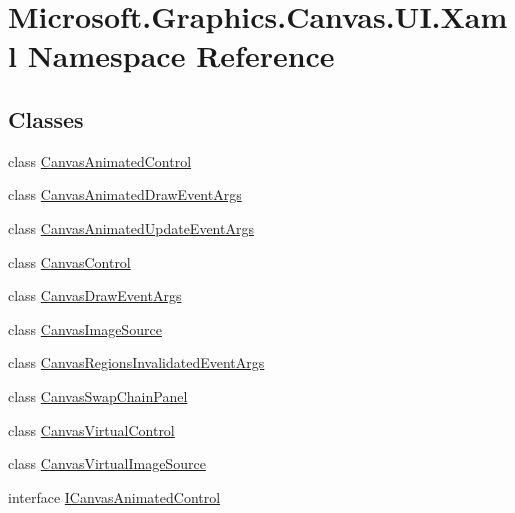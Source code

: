 \hypertarget{namespace_microsoft_1_1_graphics_1_1_canvas_1_1_u_i_1_1_xaml}{}\section{Microsoft.\+Graphics.\+Canvas.\+U\+I.\+Xaml Namespace Reference}
\label{namespace_microsoft_1_1_graphics_1_1_canvas_1_1_u_i_1_1_xaml}
\subsection*{Classes}
\begin{DoxyCompactItemize}
\item 
class \hyperlink{class_microsoft_1_1_graphics_1_1_canvas_1_1_u_i_1_1_xaml_1_1_canvas_animated_control}{Canvas\+Animated\+Control}
\item 
class \hyperlink{class_microsoft_1_1_graphics_1_1_canvas_1_1_u_i_1_1_xaml_1_1_canvas_animated_draw_event_args}{Canvas\+Animated\+Draw\+Event\+Args}
\item 
class \hyperlink{class_microsoft_1_1_graphics_1_1_canvas_1_1_u_i_1_1_xaml_1_1_canvas_animated_update_event_args}{Canvas\+Animated\+Update\+Event\+Args}
\item 
class \hyperlink{class_microsoft_1_1_graphics_1_1_canvas_1_1_u_i_1_1_xaml_1_1_canvas_control}{Canvas\+Control}
\item 
class \hyperlink{class_microsoft_1_1_graphics_1_1_canvas_1_1_u_i_1_1_xaml_1_1_canvas_draw_event_args}{Canvas\+Draw\+Event\+Args}
\item 
class \hyperlink{class_microsoft_1_1_graphics_1_1_canvas_1_1_u_i_1_1_xaml_1_1_canvas_image_source}{Canvas\+Image\+Source}
\item 
class \hyperlink{class_microsoft_1_1_graphics_1_1_canvas_1_1_u_i_1_1_xaml_1_1_canvas_regions_invalidated_event_args}{Canvas\+Regions\+Invalidated\+Event\+Args}
\item 
class \hyperlink{class_microsoft_1_1_graphics_1_1_canvas_1_1_u_i_1_1_xaml_1_1_canvas_swap_chain_panel}{Canvas\+Swap\+Chain\+Panel}
\item 
class \hyperlink{class_microsoft_1_1_graphics_1_1_canvas_1_1_u_i_1_1_xaml_1_1_canvas_virtual_control}{Canvas\+Virtual\+Control}
\item 
class \hyperlink{class_microsoft_1_1_graphics_1_1_canvas_1_1_u_i_1_1_xaml_1_1_canvas_virtual_image_source}{Canvas\+Virtual\+Image\+Source}
\item 
interface \hyperlink{interface_microsoft_1_1_graphics_1_1_canvas_1_1_u_i_1_1_xaml_1_1_i_canvas_animated_control}{I\+Canvas\+Animated\+Control}

\end{DoxyCompactItemize}

